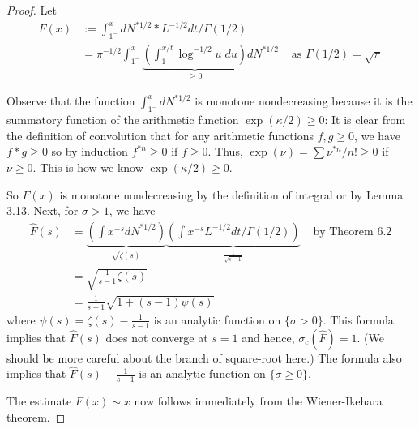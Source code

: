 \documentclass[12pt]{article}
\newcommand{\Fhat}{\widehat{F}}
\begin{document}
\begin{proof}
Let
\begin{align*}
F(x) &:= \int_{1^-}^x dN^{*1/2} * L^{-1/2} dt / \Gamma(1/2)\\
&= \pi^{-1/2} \int_{1^-}^x \underbrace{\left( \int_1^{x/t} \log^{-1/2} u \; du \right)}_{\geq 0} dN^{*1/2} &\text{ as } \Gamma(1/2) = \sqrt{\pi}
\end{align*}

Observe that the function $\int_{1^-}^x dN^{*1/2}$ is monotone nondecreasing because it is the summatory function of the arithmetic function $\exp(\kappa/2) \geq 0$: It is clear from the definition of convolution that for any arithmetic functions $f, g \geq 0$, we have $f * g \geq 0$ so by induction $f^{*n} \geq 0$ if $f \geq 0$. Thus, $\exp(\nu) = \sum \nu^{*n}/n! \geq 0$ if $\nu \geq 0$. This is how we know $\exp(\kappa/2) \geq 0$.

So $F(x)$ is monotone nondecreasing by the definition of integral or by Lemma 3.13. Next, for $\sigma > 1$, we have
\begin{align*}
\Fhat(s) &= \underbrace{\left(\int x^{-s} dN^{*1/2} \right)}_{\sqrt{\zeta(s)}} \underbrace{\left( \int x^{-s} L^{-1/2} dt / \Gamma(1/2) \right)}_{\frac{1}{\sqrt{s-1}}} &\text{ by Theorem 6.2}\\
&= \sqrt{\frac{1}{s-1} \zeta(s)}\\
&= \frac{1}{s-1} \sqrt{1 + (s - 1) \psi(s)}
\end{align*}
where $\psi(s) = \zeta(s) - \frac{1}{s - 1}$ is an analytic function on $\{\sigma > 0\}$. This formula implies that $\Fhat(s)$ does not converge at $s = 1$ and hence, $\sigma_c(\Fhat) = 1$. (We should be more careful about the branch of square-root here.) The formula also implies that $\Fhat(s) - \frac{1}{s - 1}$ is an analytic function on $\{\sigma \geq 0\}$.

The estimate $F(x) \sim x$ now follows immediately from the Wiener-Ikehara theorem.
\end{proof}

\unless\ifdefined\IsMainDocument
\end{document}
